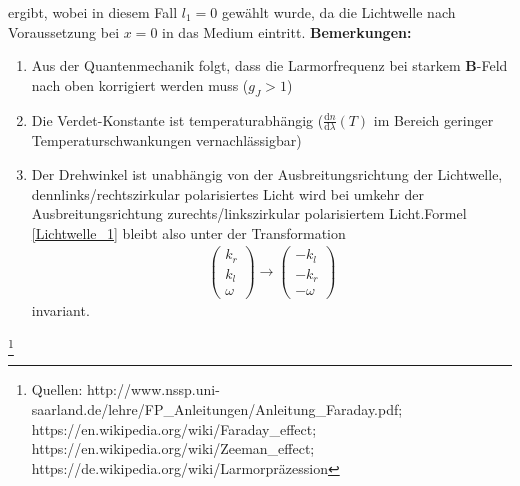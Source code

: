 \documentclass[12pt,a4paper]{article}
\begin{document}
ergibt, wobei in diesem Fall $l_1 = 0$ gewählt wurde, da die Lichtwelle nach Voraussetzung bei $x=0$ in das Medium eintritt.\newpage
\textbf{Bemerkungen:}
\begin{enumerate}
\item
Aus der Quantenmechanik folgt, dass die Larmorfrequenz bei starkem \textbf{B}-Feld nach oben korrigiert werden muss ($g_J > 1$)
\item
Die Verdet-Konstante ist temperaturabhängig ($\frac{\text{d} n}{\text{d} \lambda}(T)$ im Bereich geringer Temperaturschwankungen vernachlässigbar)
\item
Der Drehwinkel ist unabhängig von der Ausbreitungsrichtung der Lichtwelle, denn\newline links/rechtszirkular polarisiertes Licht wird bei umkehr der Ausbreitungsrichtung zu\newline rechts/linkszirkular polarisiertem Licht.\newline Formel \ref{Lichtwelle_1} bleibt also unter der Transformation 
\begin{align}
\begin{pmatrix}
k_r \\
k_l \\
\omega
\end{pmatrix} \rightarrow 
\begin{pmatrix}
-k_l\\
-k_r\\
-\omega
\end{pmatrix}
\end{align} invariant. 
\end{enumerate} 

\footnote{Quellen: \newline http://www.nssp.uni-saarland.de/lehre/FP\_Anleitungen/Anleitung\_Faraday.pdf; \newline https://en.wikipedia.org/wiki/Faraday\_effect; https://en.wikipedia.org/wiki/Zeeman\_effect; \newline https://de.wikipedia.org/wiki/Larmorpräzession}
\end{document}
